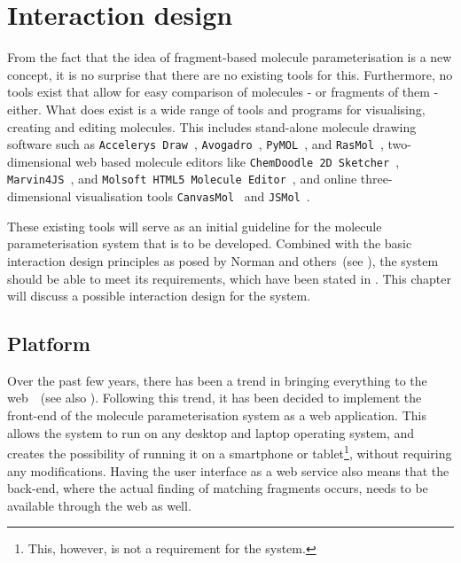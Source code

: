\chapter{Interaction design}

From the fact that the idea of fragment-based molecule parameterisation is a new concept, it is no surprise that there are no existing tools for this. Furthermore, no tools exist that allow for easy comparison of molecules - or fragments of them - either. What does exist is a wide range of tools and programs for visualising, creating and editing molecules. This includes stand-alone molecule drawing software such as \verb|Accelerys Draw|~\cite{accelrys2012accelrys}, \verb|Avogadro|~\cite{hanwell2012avogadro}, \verb|PyMOL|~\cite{delano2002pymol}, and \verb|RasMol|~\cite{pembroke2000bio}, two-dimensional web based molecule editors like \verb|ChemDoodle 2D Sketcher|~\cite{ichemlabs2013chemdoodle}, \verb|Marvin4JS|~\cite{chemxon2013marvin}, and \verb|Molsoft HTML5 Molecule Editor|~\cite{molsoft2012molsoft}, and online three-dimensional visualisation tools \verb|CanvasMol|~\cite{altered2013canvasmol} and \verb|JSMol|~\cite{hanson2013jsmol}.

These existing tools will serve as an initial guideline for the molecule parameterisation system that is to be developed. Combined with the basic interaction design principles as posed by Norman and others~(see ), the system should be able to meet its requirements, which have been stated in . This chapter will discuss a possible interaction design for the system. 


\section{Platform}
Over the past few years, there has been a trend in bringing everything to the web~\cite{ertl2010molecular}~(see also ). Following this trend, it has been decided to implement the front-end of the molecule parameterisation system as a web application. This allows the system to run on any desktop and laptop operating system, and creates the possibility of running it on a smartphone or tablet\footnote{This, however, is not a requirement for the system.}, without requiring any modifications. Having the user interface as a web service also means that the back-end, where the actual finding of matching fragments occurs, needs to be available through the web as well.


